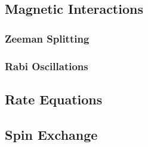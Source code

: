 \subsection{Magnetic Interactions}

\subsubsection{Zeeman Splitting}

\subsubsection{Rabi Oscillations}

\subsection{Rate Equations}


\subsection{Spin Exchange}